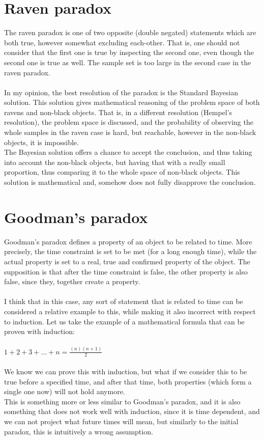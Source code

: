 \documentclass[english]{report}
\begin{document}
\section{Raven paradox}

The raven paradox is one of two opposite (double negated) statements which are both true, however somewhat excluding each-other. That is, one should not consider that the first one is true by inspecting the second one, even though the second one is true as well. The sample set is too large in the second case in the raven paradox.
\\\\
In my opinion, the best resolution of the paradox is the Standard Bayesian solution. This solution gives mathematical reasoning of the problem space of both ravens and non-black objects. That is, in a different resolution (Hempel's resolution), the problem space is discussed, and the probability of observing the whole samples in the raven case is hard, but reachable, however in the non-black objects, it is impossible.
\\
The Bayesian solution offers a chance to accept the conclusion, and thus taking into account the non-black objects, but having that with a really small proportion, thus comparing it to the whole space of non-black objects. This solution is mathematical and, somehow does not fully disapprove the conclusion.

\section{Goodman's paradox}

Goodman's paradox defines a property of an object to be related to time. More precisely, the time constraint is set to be met (for a long enough time), while the actual property is set to a real, true and confirmed property of the object. The supposition is that after the time constraint is false, the other property is also false, since they, together create a property.
\\\\
I think that in this case, any sort of statement that is related to time can be considered a relative example to this, while making it also incorrect with respect to induction. Let us take the example of a mathematical formula that can be proven with induction: \\\\
$1 + 2 + 3 + \dots + n = \frac{(n)(n+1)}{2}$
\\\\
We know we can prove this with induction, but what if we consider this to be true before a specified time, and after that time, both properties (which form a single one now) will not hold anymore.\\
This is something more or less similar to Goodman's paradox, and it is also something that does not work well with induction, since it is time dependent, and we can not project what future times will mean, but similarly to the initial paradox, this is intuitively a wrong assumption.
\end{document}
